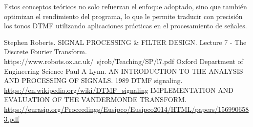 \documentclass{article}
\begin{document}
Estos conceptos teóricos no solo refuerzan el enfoque adoptado, sino que también optimizan el rendimiento del programa, lo que le permite traducir con precisión los tonos DTMF utilizando aplicaciones prácticas en el procesamiento de señales.

\newpage

\begin{thebibliography}{99}
Stephen Roberts. SIGNAL PROCESSING \& FILTER
DESIGN. Lecture 7 - The Discrete Fourier Transform.  https://www.robots.ox.ac.uk/~sjrob/Teaching/SP/l7.pdf Oxford Department of Engineering Science 
 Paul A Lynn. AN INTRODUCTION TO THE ANALYSIS AND PROCESSING OF SIGNALS. 1989
 DTMF signaling. \url{https://en.wikipedia.org/wiki/DTMF_signaling}
 IMPLEMENTATION AND EVALUATION OF THE VANDERMONDE TRANSFORM. \url{https://eurasip.org/Proceedings/Eusipco/Eusipco2014/HTML/papers/1569906583.pdf}
\end{thebibliography}
\end{document}

